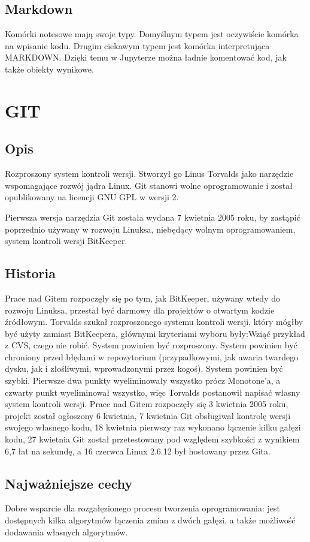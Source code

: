 \documentclass{article}
\begin{document}
\subsection{Markdown}
Komórki notesowe mają swoje typy. Domyślnym typem jest oczywiście komórka na wpisanie kodu. Drugim ciekawym typem jest komórka interpretująca MARKDOWN. Dzięki temu w Jupyterze można ładnie komentować kod, jak także obiekty wynikowe.
\newpage
\section{GIT}
\subsection{Opis}
Rozproszony system kontroli wersji. Stworzył go Linus Torvalds jako narzędzie wspomagające rozwój jądra Linux. Git stanowi wolne oprogramowanie i został opublikowany na licencji GNU GPL w wersji 2.

Pierwsza wersja narzędzia Git została wydana 7 kwietnia 2005 roku, by zastąpić poprzednio używany w rozwoju Linuksa, niebędący wolnym oprogramowaniem, system kontroli wersji BitKeeper.
\subsection{Historia}
Prace nad Gitem rozpoczęły się po tym, jak BitKeeper, używany wtedy do rozwoju Linuksa, przestał być darmowy dla projektów o otwartym kodzie źródłowym. Torvalds szukał rozproszonego systemu kontroli wersji, który mógłby być użyty zamiast BitKeepera, głównymi kryteriami wyboru były:Wziąć przykład z CVS, czego nie robić. System powinien być rozproszony.
System powinien być chroniony przed błędami w repozytorium (przypadkowymi, jak awaria twardego dysku, jak i złośliwymi, wprowadzonymi przez kogoś).
System powinien być szybki. Pierwsze dwa punkty wyeliminowały wszystko prócz Monotone'a, a czwarty punkt wyeliminował wszystko, więc Torvalds postanowił napisać własny system kontroli wersji.
Prace nad Gitem rozpoczęły się 3 kwietnia 2005 roku, projekt został ogłoszony 6 kwietnia, 7 kwietnia Git obsługiwał kontrolę wersji swojego własnego kodu, 18 kwietnia pierwszy raz wykonano łączenie kilku gałęzi kodu, 27 kwietnia Git został przetestowany pod względem szybkości z wynikiem 6,7 łat na sekundę, a 16 czerwca Linux 2.6.12 był hostowany przez Gita.
\subsection{Najważniejsze cechy}
Dobre wsparcie dla rozgałęzionego procesu tworzenia oprogramowania: jest dostępnych kilka algorytmów łączenia zmian z dwóch gałęzi, a także możliwość dodawania własnych algorytmów.
\end{document}
